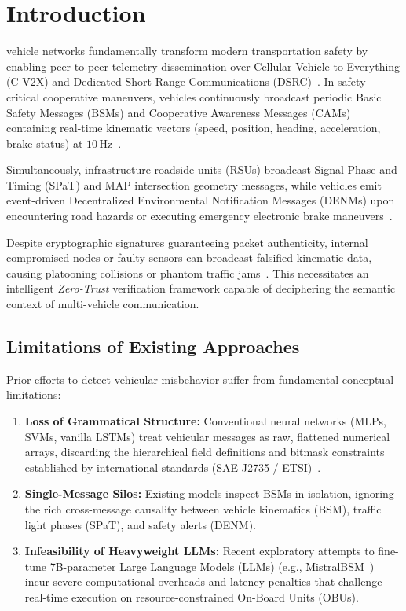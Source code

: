 \documentclass[journal,compsoc]{IEEEtran}
\begin{document}
\maketitle
\IEEEdisplaynontitleabstractindextext
\IEEEpeerreviewmaketitle

\section{Introduction}
 vehicle networks fundamentally transform modern transportation safety by enabling peer-to-peer telemetry dissemination over Cellular Vehicle-to-Everything (C-V2X) and Dedicated Short-Range Communications (DSRC)~\cite{saej2735_2020,etsi_cam_2019}. In safety-critical cooperative maneuvers, vehicles continuously broadcast periodic Basic Safety Messages (BSMs) and Cooperative Awareness Messages (CAMs) containing real-time kinematic vectors (speed, position, heading, acceleration, brake status) at $10\,\text{Hz}$~\cite{vanderheijden2018veremi}.

Simultaneously, infrastructure roadside units (RSUs) broadcast Signal Phase and Timing (SPaT) and MAP intersection geometry messages, while vehicles emit event-driven Decentralized Environmental Notification Messages (DENMs) upon encountering road hazards or executing emergency electronic brake maneuvers~\cite{etsi_denm_2019}. 

Despite cryptographic signatures guaranteeing packet authenticity, internal compromised nodes or faulty sensors can broadcast falsified kinematic data, causing platooning collisions or phantom traffic jams~\cite{grover2022machine,sharma2023collaborative}. This necessitates an intelligent \textit{Zero-Trust} verification framework capable of deciphering the semantic context of multi-vehicle communication.

\subsection{Limitations of Existing Approaches}
Prior efforts to detect vehicular misbehavior suffer from fundamental conceptual limitations:
\begin{enumerate}
    \item \textbf{Loss of Grammatical Structure:} Conventional neural networks (MLPs, SVMs, vanilla LSTMs) treat vehicular messages as raw, flattened numerical arrays, discarding the hierarchical field definitions and bitmask constraints established by international standards (SAE J2735 / ETSI)~\cite{alladi2020deep}.
    \item \textbf{Single-Message Silos:} Existing models inspect BSMs in isolation, ignoring the rich cross-message causality between vehicle kinematics (BSM), traffic light phases (SPaT), and safety alerts (DENM).
    \item \textbf{Infeasibility of Heavyweight LLMs:} Recent exploratory attempts to fine-tune 7B-parameter Large Language Models (LLMs) (e.g., MistralBSM~\cite{mistralbsm2024}) incur severe computational overheads and latency penalties that challenge real-time execution on resource-constrained On-Board Units (OBUs).
\end{enumerate}
\end{document}
